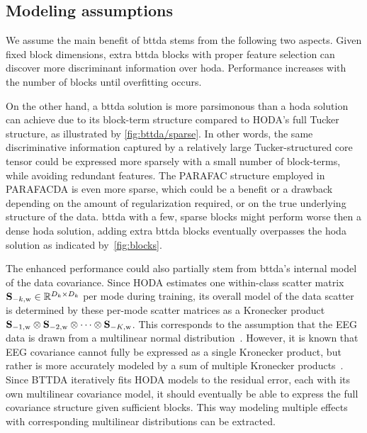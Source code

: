 \documentclass[twocolumn]{article}
\begin{document}
\subsection{Modeling assumptions}

We assume the main benefit of \ac{bttda} stems from the following two aspects.
Given fixed block dimensions, extra \ac{bttda} blocks with proper feature selection
can discover more discriminant information over \ac{hoda}.
Performance increases with the number of blocks until overfitting occurs.

On the other hand, a \ac{bttda} solution is more parsimonous than a \ac{hoda}
solution can achieve due to its block-term structure compared to HODA's full Tucker
structure, as illustrated	by \cref{fig:bttda/sparse}.
In other words, the same discriminative information captured by a relatively large
Tucker-structured core tensor could be expressed more sparsely with a small
number of block-terms, while avoiding redundant features.
The PARAFAC structure employed in PARAFACDA is even more sparse, which could be
a benefit or a drawback depending on the amount of regularization required,
or on the true underlying structure of the data.
\Ac{bttda} with a few, sparse blocks might perform worse then a dense \ac{hoda}
solution, adding extra \ac{bttda} blocks eventually overpasses the \ac{hoda}
solution as indicated by~\cref{fig:blocks}.

The enhanced performance could also partially stem from \ac{bttda}'s internal
model of the data covariance.
Since HODA estimates one within-class scatter matrix
$\mathbf{S}_{-k,\text{w}}\in\mathbb{R}^{D_k\times D_k}$ per mode during training,
its overall model of the data scatter is determined by these per-mode scatter matrices as a
Kronecker product $\mathbf{S}_{-1,\text{w}}\otimes \mathbf{S}_{-2,\text{w}}\otimes\cdots\otimes \mathbf{S}_{-K,\text{w}}$.
This corresponds to the assumption that the EEG data is
drawn from a multilinear normal distribution~\cite{Ohlson2013}.
However, it is known that EEG covariance cannot fully be expressed as a
single Kronecker product, but rather is more accurately modeled by a sum of
multiple Kronecker products~\cite{Bijma2005, Sosulski2022}.
Since BTTDA iteratively fits HODA models to the residual error, each with its own
multilinear covariance model, it should eventually be able to express the full
covariance structure given sufficient blocks.
This way modeling multiple effects with corresponding multilinear distributions
can be extracted.
\end{document}
